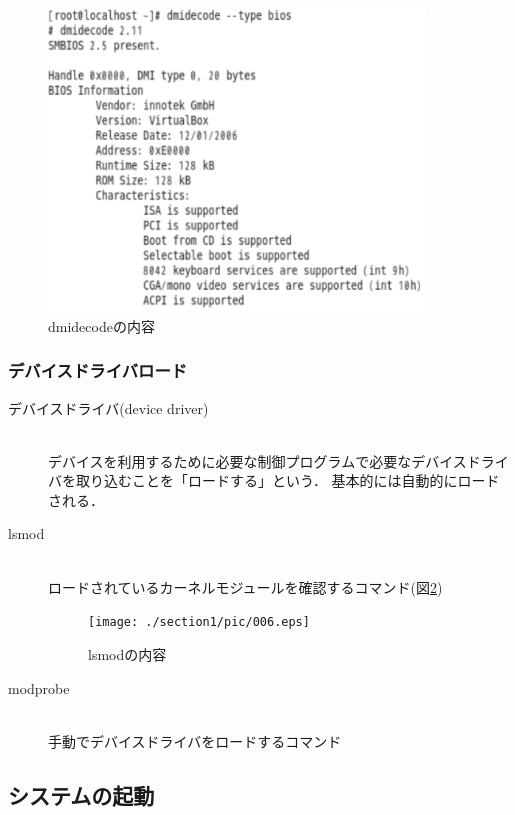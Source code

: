 \begin{figure}[!h]
	\begin{center}
		\includegraphics[width=10cm]{./section1/pic/005.eps}
		\caption{dmidecodeの内容}
		\label{005}
	\end{center}
\end{figure}

\clearpage
\subsubsection{デバイスドライバロード}
\begin{description}
	\item[デバイスドライバ(device driver)]\mbox{}\\
	デバイスを利用するために必要な制御プログラムで必要なデバイスドライバを取り込むことを「ロードする」という．
	基本的には自動的にロードされる．
	\item[lsmod]\mbox{}\\
	ロードされているカーネルモジュールを確認するコマンド(図\ref{006})
		\begin{figure}[!h]
			\begin{center}
				\texttt{[image: ./section1/pic/006.eps]}
				\caption{lsmodの内容}
				\label{006}
			\end{center}
		\end{figure}
	\item[modprobe]\mbox{}\\
	手動でデバイスドライバをロードするコマンド
\end{description}


\clearpage
\subsection{システムの起動}
